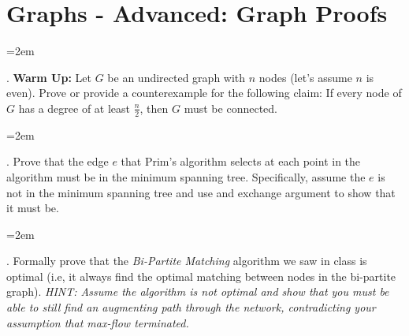 \documentclass[12pt]{article}
\def\homework{Graphs - Advanced: Graph Proofs}
\newcounter{quesnum}
\newcommand{\question}[2][??]{
\begin{list}{\labelitemi}{\leftmargin=2em}
\item [\arabic{quesnum}.] {#2}
\end{list}
\addtocounter{quesnum}{1}
}
\begin{document}
\section*{\homework}



\question[3]{
\textbf{Warm Up:} Let $G$ be an undirected graph with $n$ nodes (let's assume $n$ is even). Prove or provide a counterexample for the following claim: If every node of $G$ has a degree of at least $\frac{n}{2}$, then $G$ must be connected.
}



\question[3]{
Prove that the edge $e$ that Prim's algorithm selects at each point in the algorithm must be in the minimum spanning tree. Specifically, assume the $e$ is not in the minimum spanning tree and use and exchange argument to show that it must be.
}




\question[1]{
Formally prove that the \emph{Bi-Partite Matching} algorithm we saw in class is optimal (i.e, it always find the optimal matching between nodes in the bi-partite graph). \emph{HINT: Assume the algorithm is not optimal and show that you must be able to still find an augmenting path through the network, contradicting your assumption that max-flow terminated.}
}



\end{document}
